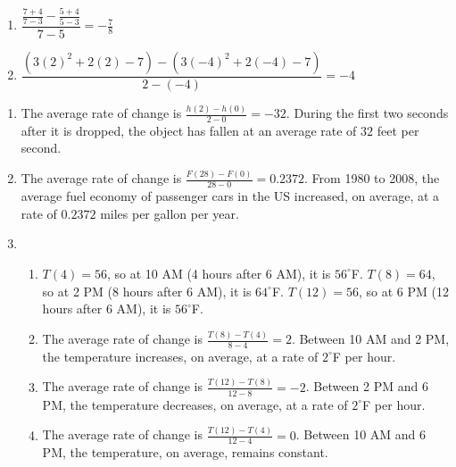 \documentclass{ximera}
\begin{document}
\begin{multicols}{2}
\begin{enumerate}
\setcounter{enumi}{\value{HW}}


\item $\dfrac{\frac{7 + 4}{7 - 3} - \frac{5 + 4}{5 - 3}}{7 - 5} = -\frac{7}{8}$
\item \scriptsize $\dfrac{(3(2)^{2}+2(2)-7)-(3(-4)^{2}+2(-4)-7)}{2-(-4)}=-4$ \normalsize



\setcounter{HW}{\value{enumi}}
\end{enumerate}
\end{multicols}


\begin{enumerate}
\setcounter{enumi}{\value{HW}}


\item The average rate of change is $\frac{h(2) - h(0)}{2-0}=-32$.  During the first two seconds after it is dropped, the object has fallen at an average rate of $32$ feet per second.

\item The average rate of change is $\frac{F(28) - F(0)}{28-0}=0.2372$.  From 1980 to 2008, the average fuel economy of passenger cars in the US increased, on average, at a rate of $0.2372$ miles per gallon per year.

\item
\begin{enumerate}

\item  $T(4) = 56$, so at 10 AM (4 hours after 6 AM), it is $56^{\circ}$F.  $T(8) = 64$, so at 2 PM (8 hours after 6 AM), it is $64^{\circ}$F.  $T(12) = 56$, so at 6 PM (12 hours after 6 AM), it is $56^{\circ}$F.

\item  The average rate of change is $\frac{T(8)-T(4)}{8-4}=2$.  Between 10 AM and 2 PM, the temperature increases, on average, at a rate of $2^{\circ}$F per hour.

\item  The average rate of change is $\frac{T(12)-T(8)}{12-8}=-2$.  Between 2 PM and 6 PM, the temperature decreases, on average, at a rate of $2^{\circ}$F per hour.

\item  The average rate of change is $\frac{T(12)-T(4)}{12-4}=0$.  Between 10 AM and 6 PM, the temperature, on average, remains constant.

\end{enumerate}



\end{enumerate}
\end{document}
